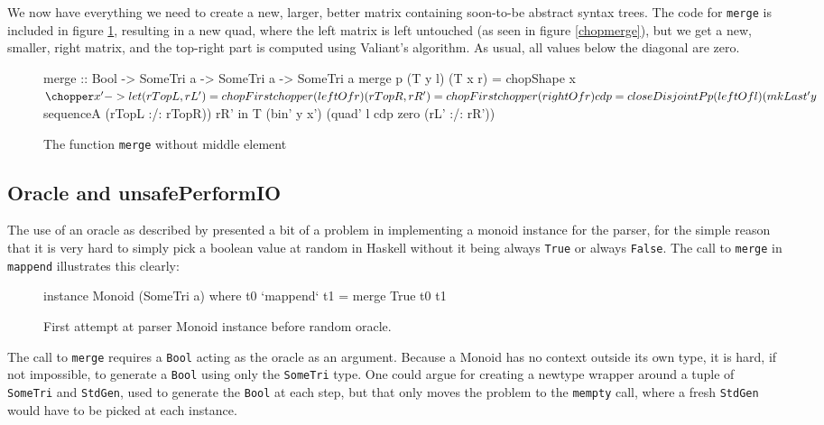 \documentclass[a4paper,12pt,twosided]{report}
\begin{document}
We now have everything we need to create a new, larger, better matrix containing
soon-to-be abstract syntax trees. The code for \texttt{merge} is included in
figure \ref{merge}, resulting in a new quad, where the left matrix is left
untouched (as seen in figure \ref{chopmerge}), but we get a new, smaller, right
matrix, and the top-right part is computed using Valiant's algorithm. As usual,
all values below the diagonal are zero.

\begin{figure}[H]
\begin{code}
merge :: Bool -> SomeTri a -> SomeTri a -> SomeTri a
merge p (T y l) (T x r) = chopShape x $ \chopper x' ->
    let (rTopL, rL') = chopFirst chopper (leftOf r)
        (rTopR, rR') = chopFirst chopper (rightOf r)
        cdp = closeDisjointP p (leftOf l) 
                (mkLast' y $ sequenceA (rTopL :/: rTopR)) rR'
    in T (bin' y x') (quad' l cdp zero (rL' :/: rR'))
\end{code}
\caption{The function \texttt{merge} without middle element}
\label{merge}
\end{figure}

\subsection{Oracle and unsafePerformIO}
\label{oraclesection}
The use of an oracle as described by \citet{parparsepaper} presented a bit
of a problem in implementing a monoid instance for the parser, for the simple
reason that it is very hard to simply pick a boolean value at random in Haskell
without it being always \texttt{True} or always \texttt{False}. The call to
\texttt{merge} in \texttt{mappend} illustrates this clearly:

\begin{figure}[H]
\begin{code}
instance Monoid (SomeTri a) where
    t0 `mappend` t1 = merge True t0 t1
\end{code}
\caption{First attempt at parser Monoid instance before random oracle.}
\end{figure}

The call to \texttt{merge} requires a \texttt{Bool} acting as the oracle as an
argument. Because a Monoid has no context outside its own type, it is hard, if not
impossible, to generate a \texttt{Bool} using only the \texttt{SomeTri} type.
One could argue for creating a newtype wrapper around a tuple of
\texttt{SomeTri} and \texttt{StdGen}, used to generate the \texttt{Bool} at each
step, but that only moves the problem to the \texttt{mempty}
call, where a fresh \texttt{StdGen} would have to be picked at each instance.
\end{document}
